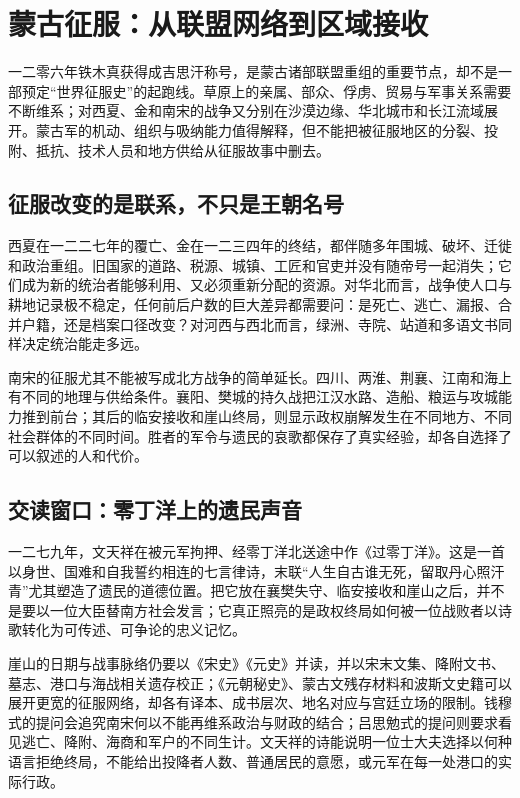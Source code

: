 \section{蒙古征服：从联盟网络到区域接收}

一二零六年铁木真获得成吉思汗称号，是蒙古诸部联盟重组的重要节点，却不是一部预定“世界征服史”的起跑线。草原上的亲属、部众、俘虏、贸易与军事关系需要不断维系；对西夏、金和南宋的战争又分别在沙漠边缘、华北城市和长江流域展开。蒙古军的机动、组织与吸纳能力值得解释，但不能把被征服地区的分裂、投附、抵抗、技术人员和地方供给从征服故事中删去。

\subsection{征服改变的是联系，不只是王朝名号}

西夏在一二二七年的覆亡、金在一二三四年的终结，都伴随多年围城、破坏、迁徙和政治重组。旧国家的道路、税源、城镇、工匠和官吏并没有随帝号一起消失；它们成为新的统治者能够利用、又必须重新分配的资源。对华北而言，战争使人口与耕地记录极不稳定，任何前后户数的巨大差异都需要问：是死亡、逃亡、漏报、合并户籍，还是档案口径改变？对河西与西北而言，绿洲、寺院、站道和多语文书同样决定统治能走多远。

南宋的征服尤其不能被写成北方战争的简单延长。四川、两淮、荆襄、江南和海上有不同的地理与供给条件。襄阳、樊城的持久战把江汉水路、造船、粮运与攻城能力推到前台；其后的临安接收和崖山终局，则显示政权崩解发生在不同地方、不同社会群体的不同时间。胜者的军令与遗民的哀歌都保存了真实经验，却各自选择了可以叙述的人和代价。

\subsection{交读窗口：零丁洋上的遗民声音}

一二七九年，文天祥在被元军拘押、经零丁洋北送途中作《过零丁洋》。这是一首以身世、国难和自我誓约相连的七言律诗，末联“人生自古谁无死，留取丹心照汗青”尤其塑造了遗民的道德位置。把它放在襄樊失守、临安接收和崖山之后，并不是要以一位大臣替南方社会发言；它真正照亮的是政权终局如何被一位战败者以诗歌转化为可传述、可争论的忠义记忆。

崖山的日期与战事脉络仍要以《宋史》《元史》并读，并以宋末文集、降附文书、墓志、港口与海战相关遗存校正；《元朝秘史》、蒙古文残存材料和波斯文史籍可以展开更宽的征服网络，却各有译本、成书层次、地名对应与宫廷立场的限制。钱穆式的提问会追究南宋何以不能再维系政治与财政的结合；吕思勉式的提问则要求看见逃亡、降附、海商和军户的不同生计。文天祥的诗能说明一位士大夫选择以何种语言拒绝终局，不能给出投降者人数、普通居民的意愿，或元军在每一处港口的实际行政。

